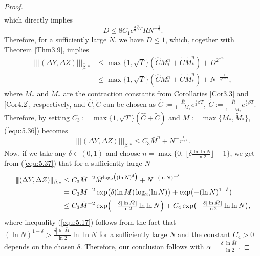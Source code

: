 \documentclass[10pt,a4paper]{article}
\newcommand{\bR}{\bar{R}}
\newcommand{\hC}{\hat{C}}
\newcommand{\hM}{\hat{M}}
\newcommand{\vep}{{\varepsilon}}
\theoremstyle{plain}
\theoremstyle{definition}
\numberwithin{equation}{section}
\newcommand{\trinm}[1]{\vert\!\vert\!\vert #1 \vert\!\vert\!\vert}
\begin{document}
\begin{proof}
\begin{align}
\end{align}
which directly implies
\begin{equation}
\label{equ:5.estD}
D \leq 8C_{1}e^{\tfrac{3}{2} \bar{\beta} T} \bR N^{-\tfrac{1}{2}}.
\end{equation}
Therefore, for a sufficiently large $N$, we have $D \leq 1$, which, together with Theorem \ref{Thm3.9}, implies
\begin{align}\nonumber
\trinm{(\Delta Y,\Delta Z)}_{\bar{\beta},*} &\leq \max\{1,\sqrt{T}\}(\hat{C}M_{*}^{n} + \tilde{C}\tilde{M}_{*}^{n}) + D^{2^{-n}}\\
&\leq \max\{1,\sqrt{T}\}(\hat{C}M_{*}^{n} + \tilde{C}\tilde{M}_{*}^{n}) + N^{-\tfrac{1}{2^{n+1}}}, \label{equ:5.36}
\end{align}
where $M_{*}$ and $\tilde{M}_{*}$ are the contraction constants from Corollaries \ref{Cor3.3} and \ref{Cor4.2}, respectively, and $\hat{C}, \tilde C$ can be chosen as
$
\hat{C} := \tfrac{\bR}{1-M_{*}}e^{\tfrac{1}{2} \bar{\beta} T},\   \tilde{C} := \tfrac{ \bR}{1-\tilde{M}_{*}}e^{\tfrac{1}{2} \bar{\beta} T}.
$
Therefore, by setting $C_{3} := \max\{1,\sqrt{T}\}(\hat{C} + \tilde{C})$ and $\bar{M} := \max\{M_{*},\tilde{M}_{*}\}$, (\ref{equ:5.36}) becomes
\begin{equation}
\label{equ:5.37}
\trinm{ (\Delta Y,\Delta Z)}_{\bar{\beta},*} \leq C_{3}\bar{M}^{n} + N^{-\tfrac{1}{2^{n+1}}}.
\end{equation}
Now, if we take any 
$\delta \in (0,1)$ and choose $n = \max\bigl\{0 , \ \lfloor \delta \frac{  \ln \ln N}{ \ln{2}}
\rfloor -1\bigr\}$, we get from (\ref{equ:5.37}) that for a sufficiently large $N$
\begin{align}
\trinm{(\Delta Y,\Delta Z)}_{\bar{\beta},*} &\leq C_{3}\bar{M}^{-2}\bar{M}^{\log_{2}\bigl((\ln{N})^{\delta}\bigr)} + N^{-(\ln{N})^{-\delta}} \nonumber \\
&= C_{3}\bar{M}^{-2}\exp\bigl(\delta(\ln{\bar{M}})\log_{2}(\ln{N})\bigr) + \exp\bigl(-(\ln{N})^{1-\delta}) \nonumber \\
&\leq C_{3}\bar{M}^{-2}\exp\Bigl(-\tfrac{\delta |\ln{\bar{M}}|}{\ln{2}}\ln{\ln{N}}\Bigr) + C_4 \exp\bigl(-\tfrac{\delta |\ln{\bar{M}}|}{\ln{2}}\ln{\ln{N}}\bigr), \label{equ:5.17}
\end{align}
where inequality (\ref{equ:5.17}) follows from the fact that
$(\ln{N})^{1-\delta} > \tfrac{\delta |\ln{\bar{M}}|}{\ln{2}} \ln{\ln{N}}$ for a sufficiently large $N$ and the constant $C_{4}>0$ depends on the chosen $\delta$. Therefore, our conclusion follows with $\alpha = \tfrac{\delta |\ln{\bar{M}}|}{\ln{2}}.$




\end{proof}
\end{document}
